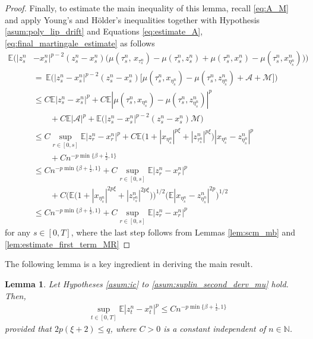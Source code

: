 \documentclass[reqno,  oneside, 12pt]{amsart}
\newtheorem{lemma}{Lemma}[section]
\newcommand{\E}{\mathbb E}
\begin{document}
\begin{proof}
	Finally, to estimate the main inequality of this lemma, recall \eqref{eq:A_M} and apply Young's and H\"older's inequalities together with Hypothesis \ref{asum:poly_lip_drift} and Equations \eqref{eq:estimate_A}, \eqref{eq:final_martingale_estimate} as follows
	\begin{align*}
		\E\Big(|z_s^n&-x_s^n|^{p-2}(z_s^n-x_s^n)\big(\mu(\tau^n_s,\,x_{\tau^n_s})-\mu(\tau^n_s,z_{s}^n)+ 	\mu(\tau^n_s,x_s^{n})-\mu(\tau^n_s,x_{\eta^n_s}^{n})\big)\Big)
		\\
		&=\,\E\Big(|z_s^n-x_s^n|^{p-2}(z_s^n-x_s^n)\Big[\mu(\tau^n_s,x_{\eta^n_s})-\mu(\tau^n_s,z_{\eta^n_s}^n)+\mathcal A+\mathcal M\Big]\Big)
		\\
		&\leq  C\E|z_s^n-x_s^n|^p+C\E|\mu(\tau^n_s,x_{\eta^n_s})-\mu(\tau^n_s,z_{\eta^n_s}^n)|^p
		\\
		&\qquad+C\E|\mathcal A|^p+\E\big(|z_s^n-x_s^n|^{p-2}(z_s^n-x_s^n)\mathcal M\big)
		\\
		&\leq     C\sup_{ r\in[0,s]}\E|z_r^n-x_r^n|^p+C\E\big(1+|x_{\eta^n_s}|^{p\xi}+|z_{\tau^n_s}^n|^{p \xi}\big)|x_{\eta^n_s}-z_{\eta^n_s}^n|^{p}
		\\
		&\qquad+Cn^{-p\min\{\beta+\frac{1}{2},1\}}
		\\
		&\leq    Cn^{-p\min\{\beta+\frac{1}{2},1\}}+ C\sup_{ r\in[0,s]}\E|z_r^n-x_r^n|^p
		\\
		&\qquad+C\Big(\E\big(1+|x_{\eta^n_s}|^{2p\xi}+|z_{\tau^n_s}^n|^{2p \xi}\big)\Big)^{1/2}\Big(\E|x_{\eta^n_s}-z_{\eta^n_s}^n|^{2p}\Big)^{1/2}
		\\
		&\leq    Cn^{-p\min\{\beta+\frac{1}{2},1\}}+ C\sup_{ r\in[0,s]}\E|z_r^n-x_r^n|^p
	\end{align*}
	for any $s\in[0,T]$, where the last step follows from Lemmas \ref{lem:scm_mb} and \ref{lem:estimate_first_term_MR}
\end{proof}


The following lemma is a key ingredient in deriving the main result.
\begin{lemma} \label{lem:estimate_last_term_MR}
	Let	Hypotheses \mbox{\normalfont  \ref{asum:ic}}
	to \mbox{\normalfont  \ref{asum:suplin_second_derv_mu}}  hold.
	Then,  
	\begin{align*}
		&\sup_{ t\in[0,T]}\E|z_t^n-x_t^{n}|^{p}
		\leq  Cn^{-p\min\{\beta+\frac{1}{2},1\}}
	\end{align*}
	provided that $2p(\xi+2)\leq q$, where  $C>0$ is a constant  independent of $n\in\mathbb N$.
\end{lemma}
\end{document}
